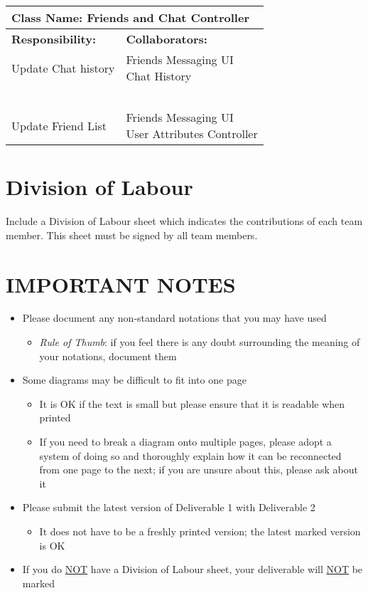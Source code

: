 \documentclass[]{article}
\begin{document}
\begin{table}[H]
    \centering
    \begin{tabular}{|p{7.5cm}|p{7.5cm}|}
        \hline
        \multicolumn{2}{|l|}{\textbf{Class Name:} Friends and Chat Controller}\\
        \hline
        \textbf{Responsibility:} & \textbf{Collaborators:}\\
        \hline
        Update Chat history & \makecell[l]{Friends Messaging UI\\Chat History}\\
        ~ & ~\\
        Update Friend List & \makecell[l]{Friends Messaging UI\\User Attributes Controller}\\
        \hline
    \end{tabular}
\end{table}

\newpage
\appendix
\section{Division of Labour}
\label{sec:division_of_labour}
Include a Division of Labour sheet which indicates the contributions of each team member. This sheet must be signed by all team members.

\newpage
\section*{IMPORTANT NOTES}
\begin{itemize}
	\item Please document any non-standard notations that you may have used
	\begin{itemize}
		\item \emph{Rule of Thumb}: if you feel there is any doubt surrounding the meaning of your notations, document them
	\end{itemize}
	\item Some diagrams may be difficult to fit into one page
	\begin{itemize}
		\item It is OK if the text is small but please ensure that it is readable when printed
		\item If you need to break a diagram onto multiple pages, please adopt a system of doing so and thoroughly explain how it can be reconnected from one page to the next; if you are unsure about this, please ask about it
	\end{itemize}
	\item Please submit the latest version of Deliverable 1 with Deliverable 2
	\begin{itemize}
		\item It does not have to be a freshly printed version; the latest marked version is OK
	\end{itemize}
	\item If you do \underline{NOT} have a Division of Labour sheet, your deliverable will \underline{NOT} be marked
\end{itemize}
\end{document}
